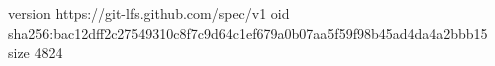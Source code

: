 version https://git-lfs.github.com/spec/v1
oid sha256:bac12dff2c27549310c8f7c9d64c1ef679a0b07aa5f59f98b45ad4da4a2bbb15
size 4824
